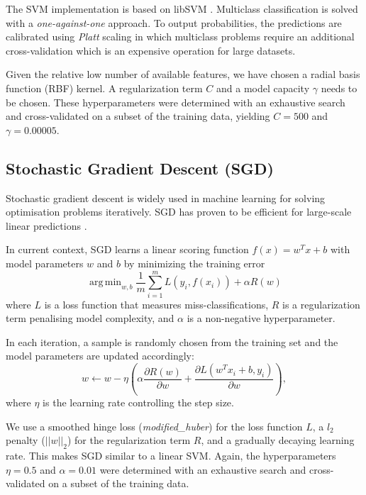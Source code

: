 \documentclass[journal]{IEEEtran}
\DeclareMathOperator*{\argmin}{arg\,min}
\begin{document}
The SVM implementation is based on libSVM \cite{chang2011libsvm}. Multiclass classification is solved with a \textit{one-against-one} approach. To output probabilities, the predictions are calibrated using \textit{Platt} scaling in which multiclass problems require an additional cross-validation which is an expensive operation for large datasets.

Given the relative low number of available features, we have chosen a radial basis function (RBF) kernel. A regularization term $C$ and a model capacity $\gamma$ needs to be chosen. These hyperparameters were determined with an exhaustive search and cross-validated on a subset of the training data, yielding $C=500$ and $\gamma=0.00005$.

\subsection{Stochastic Gradient Descent (SGD)}
Stochastic gradient descent is widely used in machine learning for solving optimisation problems iteratively. SGD has proven to be efficient for large-scale linear predictions \cite{zhang2004solving}.

In current context, SGD learns a linear scoring function $f(x) = w^Tx + b$ with model parameters $w$ and $b$ by minimizing the training error
\begin{equation}
\argmin_{w,b} \frac{1}{m}\sum_{i=1}^mL(y_i, f(x_i)) + \alpha R(w)
\end{equation}
where $L$ is a loss function that measures miss-classifications, $R$ is a regularization term penalising model complexity, and $\alpha$ is a non-negative hyperparameter.

In each iteration, a sample is randomly chosen from the training set and the model parameters are updated accordingly:
\begin{equation}
w \leftarrow w - \eta \left(\alpha \frac{\partial R(w)}{\partial w} + \frac{\partial L (w^Tx_i + b, y_i)}{\partial w} \right),
\end{equation}
where $\eta$ is the learning rate controlling the step size.

We use a smoothed hinge loss (\textit{modified\_huber}) for the loss function $L$, a $l_2$ penalty ($||w||_2$) for the regularization term $R$, and a gradually decaying learning rate. This makes SGD similar to a linear SVM. Again, the hyperparameters $\eta = 0.5$ and $\alpha = 0.01$ were determined with an exhaustive search and cross-validated on a subset of the training data.
\end{document}
